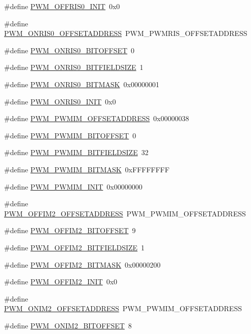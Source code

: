 \begin{DoxyCompactItemize}
\item 
\#define \hyperlink{a00565_a4cbdf9fba3e2a20e873357d3ccc9c1a0}{PWM\_\-OFFRIS0\_\-INIT}~0x0
\item 
\#define \hyperlink{a00565_ac4aa2fe5ef4a803d111d50d3c33cc09d}{PWM\_\-ONRIS0\_\-OFFSETADDRESS}~PWM\_\-PWMRIS\_\-OFFSETADDRESS
\item 
\#define \hyperlink{a00565_aa14bb3a0925508c8e3ae6935998725e8}{PWM\_\-ONRIS0\_\-BITOFFSET}~0
\item 
\#define \hyperlink{a00565_a8c664a35e7e0c30111a95b5fe1ad1311}{PWM\_\-ONRIS0\_\-BITFIELDSIZE}~1
\item 
\#define \hyperlink{a00565_aa1b799cb72a3ad42549f2294d6f3bf48}{PWM\_\-ONRIS0\_\-BITMASK}~0x00000001
\item 
\#define \hyperlink{a00565_af1203aa729f79270e6cdfef4bc9e9e90}{PWM\_\-ONRIS0\_\-INIT}~0x0
\item 
\#define \hyperlink{a00565_a469ac74ee92662446dff6988c5b5f369}{PWM\_\-PWMIM\_\-OFFSETADDRESS}~0x00000038
\item 
\#define \hyperlink{a00565_a8beac3873234629219bd895535763394}{PWM\_\-PWMIM\_\-BITOFFSET}~0
\item 
\#define \hyperlink{a00565_a42dc9b8cc0b60ec94bdd0cb9cc70218c}{PWM\_\-PWMIM\_\-BITFIELDSIZE}~32
\item 
\#define \hyperlink{a00565_ab6518f2d44583d2a58e41caafade7fc8}{PWM\_\-PWMIM\_\-BITMASK}~0xFFFFFFFF
\item 
\#define \hyperlink{a00565_abfc8e4406af6d5bfb673eec20fbc3175}{PWM\_\-PWMIM\_\-INIT}~0x00000000
\item 
\#define \hyperlink{a00565_a64c5144c2e49b2ba331da85235747794}{PWM\_\-OFFIM2\_\-OFFSETADDRESS}~PWM\_\-PWMIM\_\-OFFSETADDRESS
\item 
\#define \hyperlink{a00565_aae30b9dc7ec99f0e396dfb033776a1ce}{PWM\_\-OFFIM2\_\-BITOFFSET}~9
\item 
\#define \hyperlink{a00565_a21b3382fe6658a31067c9a968390c542}{PWM\_\-OFFIM2\_\-BITFIELDSIZE}~1
\item 
\#define \hyperlink{a00565_a995f38fa29e87f54611816509d4618d9}{PWM\_\-OFFIM2\_\-BITMASK}~0x00000200
\item 
\#define \hyperlink{a00565_a61b870db47a70b6912fbe4a99ce2f353}{PWM\_\-OFFIM2\_\-INIT}~0x0
\item 
\#define \hyperlink{a00565_a798ecf352fa4c346ce9b536964ec0ce2}{PWM\_\-ONIM2\_\-OFFSETADDRESS}~PWM\_\-PWMIM\_\-OFFSETADDRESS
\item 
\#define \hyperlink{a00565_ac852c55151e65e0336a9303acd2be579}{PWM\_\-ONIM2\_\-BITOFFSET}~8

\end{DoxyCompactItemize}
